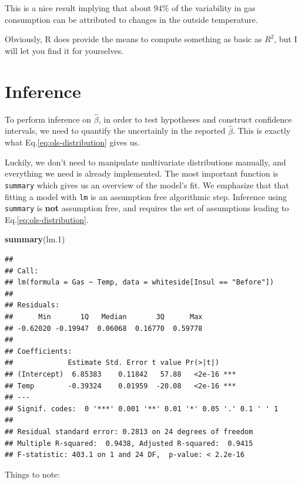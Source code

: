 \documentclass[]{book}
\newenvironment{Shaded}{\begin{snugshade}}{\end{snugshade}}
\newcommand{\KeywordTok}[1]{\textcolor[rgb]{0.13,0.29,0.53}{\textbf{#1}}}
\newcommand{\DecValTok}[1]{\textcolor[rgb]{0.00,0.00,0.81}{#1}}
\newcommand{\NormalTok}[1]{#1}
\theoremstyle{definition}
\theoremstyle{definition}
\theoremstyle{definition}
\theoremstyle{remark}
\begin{document}
This is a nice result implying that about \(94\%\) of the variability in
gas consumption can be attributed to changes in the outside temperature.

Obviously, R does provide the means to compute something as basic as
\(R^2\), but I will let you find it for yourselves.

\section{Inference}\label{inference}

To perform inference on \(\hat \beta\), in order to test hypotheses and
construct confidence intervals, we need to quantify the uncertainly in
the reported \(\hat \beta\). This is exactly what
Eq.\eqref{eq:ols-distribution} gives us.

Luckily, we don't need to manipulate multivariate distributions
manually, and everything we need is already implemented. The most
important function is \texttt{summary} which gives us an overview of the
model's fit. We emphasize that that fitting a model with \texttt{lm} is
an assumption free algorithmic step. Inference using \texttt{summary} is
\textbf{not} assumption free, and requires the set of assumptions
leading to Eq.\eqref{eq:ols-distribution}.

\begin{Shaded}
\begin{Highlighting}[]
\KeywordTok{summary}\NormalTok{(lm.}\DecValTok{1}\NormalTok{)}
\end{Highlighting}
\end{Shaded}

\begin{verbatim}
## 
## Call:
## lm(formula = Gas ~ Temp, data = whiteside[Insul == "Before"])
## 
## Residuals:
##      Min       1Q   Median       3Q      Max 
## -0.62020 -0.19947  0.06068  0.16770  0.59778 
## 
## Coefficients:
##             Estimate Std. Error t value Pr(>|t|)    
## (Intercept)  6.85383    0.11842   57.88   <2e-16 ***
## Temp        -0.39324    0.01959  -20.08   <2e-16 ***
## ---
## Signif. codes:  0 '***' 0.001 '**' 0.01 '*' 0.05 '.' 0.1 ' ' 1
## 
## Residual standard error: 0.2813 on 24 degrees of freedom
## Multiple R-squared:  0.9438, Adjusted R-squared:  0.9415 
## F-statistic: 403.1 on 1 and 24 DF,  p-value: < 2.2e-16
\end{verbatim}

Things to note:
\end{document}
